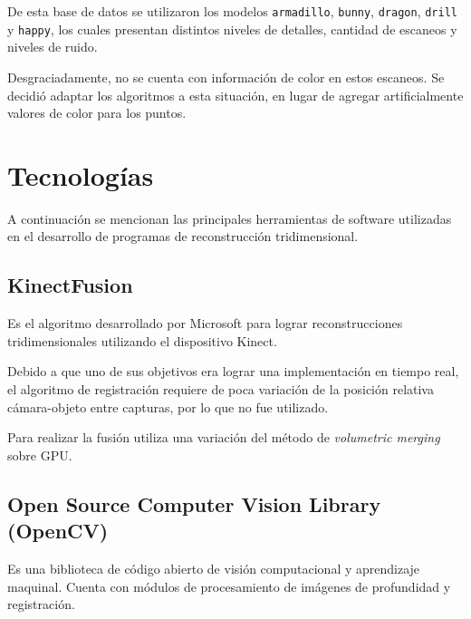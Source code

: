De esta base de datos se utilizaron los modelos
	\texttt{armadillo},
	\texttt{bunny},
	\texttt{dragon},
	\texttt{drill} y
	\texttt{happy},
los cuales presentan distintos niveles de detalles, cantidad de escaneos y niveles de ruido.


\begin{figure}
	\caption{\label{fig:stanfod_models}}
\end{figure}


Desgraciadamente, no se cuenta con información de color en estos escaneos.
Se decidió adaptar los algoritmos a esta situación, en lugar de agregar
artificialmente valores de color para los puntos.


\section{Tecnologías}
	A continuación se mencionan las principales herramientas de software
	utilizadas en el desarrollo de programas de reconstrucción tridimensional.

	\subsection{KinectFusion}
	Es el algoritmo desarrollado por Microsoft para lograr reconstrucciones
	tridimensionales utilizando el dispositivo Kinect.

	Debido a que uno de sus objetivos era lograr una implementación en tiempo
	real, el algoritmo de registración requiere de poca variación
	de la posición relativa cámara-objeto entre capturas, por lo que no fue utilizado.

	Para realizar la fusión utiliza una variación del método de
	\emph{volumetric merging} sobre GPU.\cite{Izadi:2011:KRR:2047196.2047270}





	\subsection{Open Source Computer Vision Library (OpenCV)}
	Es una biblioteca de código abierto de visión computacional y aprendizaje
	maquinal.  Cuenta con módulos de procesamiento de imágenes de profundidad y
	registración.

